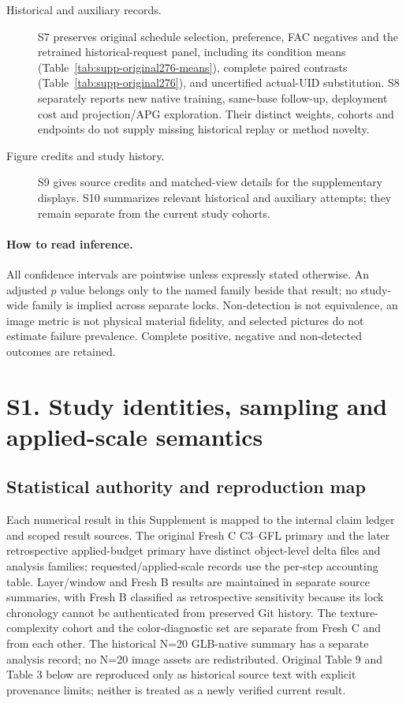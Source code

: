 \documentclass[11pt]{article}
\begin{document}
\begin{description}
\item[Historical and auxiliary records.] S7 preserves original schedule selection, preference, FAC negatives and the retrained historical-request panel, including its condition means (Table~\ref{tab:supp-original276-means}), complete paired contrasts (Table~\ref{tab:supp-original276}), and uncertified actual-UID substitution. S8 separately reports new native training, same-base follow-up, deployment cost and projection/APG exploration. Their distinct weights, cohorts and endpoints do not supply missing historical replay or method novelty.
\item[Figure credits and study history.] S9 gives source credits and matched-view details for the supplementary displays. S10 summarizes relevant historical and auxiliary attempts; they remain separate from the current study cohorts.
\end{description}

\paragraph{How to read inference.} All confidence intervals are pointwise unless expressly stated otherwise. An adjusted $p$ value belongs only to the named family beside that result; no study-wide family is implied across separate locks. Non-detection is not equivalence, an image metric is not physical material fidelity, and selected pictures do not estimate failure prevalence. Complete positive, negative and non-detected outcomes are retained.

\tableofcontents
\clearpage
\FloatBarrier
\section*{S1. Study identities, sampling and applied-scale semantics}
\label{supp:group1}

\subsection*{Statistical authority and reproduction map}
Each numerical result in this Supplement is mapped to the internal claim ledger and scoped result sources. The original Fresh C C3--GFL primary and the later retrospective applied-budget primary have distinct object-level delta files and analysis families; requested/applied-scale records use the per-step accounting table. Layer/window and Fresh B results are maintained in separate source summaries, with Fresh B classified as retrospective sensitivity because its lock chronology cannot be authenticated from preserved Git history. The texture-complexity cohort and the color-diagnostic set are separate from Fresh C and from each other. The historical N=20 GLB-native summary has a separate analysis record; no N=20 image assets are redistributed. Original Table 9 and Table 3 below are reproduced only as historical source text with explicit provenance limits; neither is treated as a newly verified current result.
\end{document}
